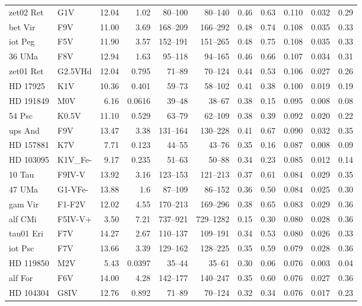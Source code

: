\documentclass[11pt,a4paper]{article}
\begin{document}
{\begin{longtable}{llrrrrrrrrr}
zet02 Ret & G1V & 12.04 & 1.02 & 80--100 & 80--140 & 0.46 & 0.63 & 0.110 & 0.032 & 0.29 \\
bet Vir & F9V & 11.00 & 3.69 & 168--209 & 166--292 & 0.48 & 0.74 & 0.108 & 0.035 & 0.33 \\
iot Peg & F5V & 11.90 & 3.57 & 152--191 & 151--265 & 0.48 & 0.75 & 0.108 & 0.035 & 0.33 \\
36 UMa & F8V & 12.94 & 1.63 & 95--118 & 94--165 & 0.46 & 0.66 & 0.107 & 0.034 & 0.31 \\
zet01 Ret & G2.5VHd & 12.04 & 0.795 & 71--89 & 70--124 & 0.44 & 0.53 & 0.106 & 0.027 & 0.26 \\
HD  17925 & K1V & 10.36 & 0.401 & 59--73 & 58--102 & 0.41 & 0.38 & 0.100 & 0.019 & 0.19 \\
HD 191849 & M0V & 6.16 & 0.0616 & 39--48 & 38--67 & 0.38 & 0.15 & 0.095 & 0.008 & 0.08 \\
54 Psc & K0.5V & 11.10 & 0.529 & 63--79 & 62--109 & 0.38 & 0.39 & 0.092 & 0.020 & 0.22 \\
ups And & F9V & 13.47 & 3.38 & 131--164 & 130--228 & 0.41 & 0.67 & 0.090 & 0.032 & 0.35 \\
HD 157881 & K7V & 7.71 & 0.123 & 44--55 & 43--76 & 0.35 & 0.16 & 0.087 & 0.008 & 0.09 \\
HD 103095 & K1V\_Fe- & 9.17 & 0.235 & 51--63 & 50--88 & 0.34 & 0.23 & 0.085 & 0.012 & 0.14 \\
10 Tau & F9IV-V & 13.92 & 3.16 & 123--153 & 121--213 & 0.37 & 0.61 & 0.084 & 0.029 & 0.35 \\
47 UMa & G1-VFe- & 13.88 & 1.6 & 87--109 & 86--152 & 0.36 & 0.50 & 0.084 & 0.025 & 0.30 \\
gam Vir & F1-F2V & 12.02 & 4.55 & 170--213 & 169--296 & 0.38 & 0.65 & 0.083 & 0.029 & 0.36 \\
alf CMi & F5IV-V+ & 3.50 & 7.21 & 737--921 & 729--1282 & 0.15 & 0.30 & 0.080 & 0.028 & 0.36 \\
tau01 Eri & F7V & 14.27 & 2.67 & 110--137 & 109--191 & 0.34 & 0.53 & 0.080 & 0.026 & 0.33 \\
iot Psc & F7V & 13.66 & 3.39 & 129--162 & 128--225 & 0.35 & 0.59 & 0.079 & 0.028 & 0.36 \\
HD 119850 & M2V & 5.43 & 0.0397 & 35--44 & 35--61 & 0.30 & 0.06 & 0.076 & 0.003 & 0.04 \\
alf For & F6V & 14.00 & 4.28 & 142--177 & 140--247 & 0.35 & 0.60 & 0.076 & 0.027 & 0.36 \\
HD 104304 & G8IV & 12.76 & 0.892 & 71--89 & 70--124 & 0.32 & 0.34 & 0.076 & 0.017 & 0.23 \\

\end{longtable}}
\end{document}
